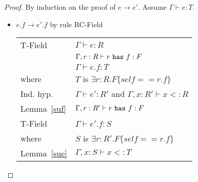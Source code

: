 \begin{proof}
By induction on the proof of $e\rightarrow e'$. Assume $\Gamma\vdash e:T$.

\begin{itemize}


\item $e.f \rightarrow e'.f$ by rule {\sc RC-Field}
\\
\begin{tabular}{ll}
{\sc T-Field} & $\Gamma\vdash e:R$
\\
& $\Gamma,r:R\vdash r~{\tt has}~f:F$
\\
& $\Gamma\vdash e.f:T$
\\
where & $T$ is $\exists r:R.F\{self==r.f\}$
\\
Ind. hyp. & $\Gamma\vdash e':R'$ and $\Gamma,x:R'\vdash x<:R$
\\
Lemma~\ref{suf} & $\Gamma,r:R'\vdash r~{\tt has}~f:F$
\\
{\sc T-Field} & $\Gamma\vdash e'.f:S$
\\
where & $S$ is $\exists r:R'.F\{self==r.f\}$
\\
Lemma~\ref{sue} & $\Gamma,x:S\vdash x<:T$
\end{tabular}



\end{itemize}
\end{proof}
